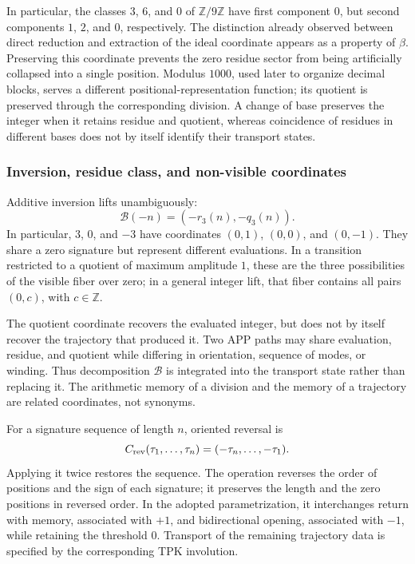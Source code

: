 In particular, the classes \(3\), \(6\), and \(0\) of
\(\mathbb Z/9\mathbb Z\) have first component \(0\), but second components
\(1\), \(2\), and \(0\), respectively. The distinction already observed
between direct reduction and extraction of the ideal coordinate appears
as a property of \(\beta\). Preserving this coordinate prevents the zero
residue sector from being artificially collapsed into a single position.
Modulus \(1000\), used later to organize decimal blocks,
serves a different positional-representation function; its quotient is
preserved through the corresponding division. A change of base preserves
the integer when it retains residue and quotient, whereas coincidence of
residues in different bases does not by itself identify their transport states.

\subsubsection{Inversion, residue class, and non-visible coordinates}
\label{trit-ampl-inversion}

Additive inversion lifts unambiguously:
\[
 \mathcal B(-n)=(-r_3(n),-q_3(n)).
\]
In particular, \(3\), \(0\), and \(-3\) have coordinates
\((0,1)\), \((0,0)\), and \((0,-1)\). They share a zero signature but
represent different evaluations. In a transition restricted to a quotient
of maximum amplitude \(1\), these are the three possibilities of the
visible fiber over zero; in a general integer lift, that fiber contains
all pairs \((0,c)\), with \(c\in\mathbb Z\).

The quotient coordinate recovers the evaluated integer, but does not by
itself recover the trajectory that produced it. Two APP paths may share
evaluation, residue, and quotient while differing in orientation, sequence
of modes, or winding. Thus decomposition \(\mathcal B\) is integrated into
the transport state rather than replacing it. The arithmetic memory of a
division and the memory of a trajectory are related coordinates, not synonyms.

For a signature sequence of length \(n\), oriented reversal is
\[
 C_{\rm rev}(\tau_1,\ldots,\tau_n)
   =(-\tau_n,\ldots,-\tau_1).
\]
Applying it twice restores the sequence. The operation reverses the order
of positions and the sign of each signature; it preserves the length and
the zero positions in reversed order. In the adopted parametrization,
it interchanges return with memory, associated with \(+1\), and bidirectional
opening, associated with \(-1\), while retaining the threshold \(0\).
Transport of the remaining trajectory data is specified by the corresponding
TPK involution.

